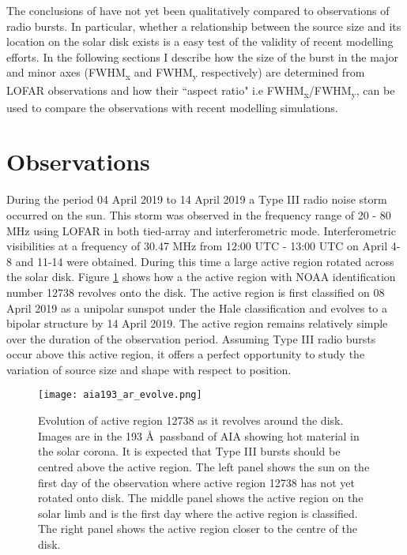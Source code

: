 The conclusions of \cite{Kontar2019} have not yet been qualitatively compared to observations of radio bursts. In particular, whether a relationship between the source size and its location on the solar disk exists is a easy test of the validity of recent modelling efforts. In the following sections I describe how the size of the burst in the major and minor axes (FWHM\textsubscript{x} and FWHM\textsubscript{y} respectively) are determined from LOFAR observations and how their ``aspect ratio" i.e FWHM\textsubscript{x}/FWHM\textsubscript{y}, can be used to compare the observations with recent modelling simulations.

\section{Observations}
\label{obsvtheory_observations}
During the period 04 April 2019 to 14 April 2019 a Type III radio noise storm occurred on the sun. This storm was observed in the frequency range of 20 - 80 MHz using LOFAR in both tied-array and interferometric mode. Interferometric visibilities at a frequency of 30.47 MHz from 12:00 UTC - 13:00 UTC on April 4-8 and 11-14 were obtained. During this time a large active region rotated across the solar disk. Figure \ref{fig:ar_evolve} shows how a the active region with NOAA identification number 12738 revolves onto the disk. The active region is first classified on 08 April 2019 as a unipolar sunspot under the Hale classification and evolves to a bipolar structure by 14 April 2019. The active region remains relatively simple over the duration of the observation period. Assuming Type III radio bursts occur above this active region, it offers a perfect opportunity to study the variation of source size and shape with respect to position. 

\begin{figure}[ht]
\centering
\texttt{[image: aia193\_ar\_evolve.png]}
\caption[Evolution of active region 12738 as it revolves around the disk.]{Evolution of active region 12738 as it revolves around the disk. Images are in the 193 \AA \ passband of AIA showing hot material in the solar corona. It is expected that Type III bursts should be centred above the active region. The left panel shows the sun on the first day of the observation where active region 12738 has not yet rotated onto disk. The middle panel shows the active region on the solar limb and is the first day where the active region is classified. The right panel shows the active region closer to the centre of the disk. }
\label{fig:ar_evolve}
\end{figure}

